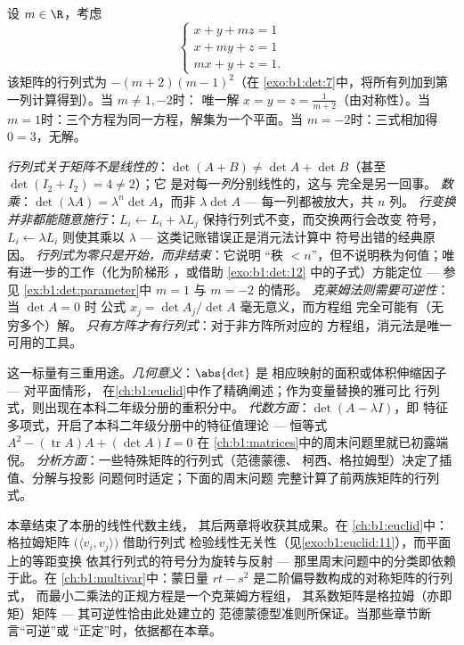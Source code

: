 \begin{example}[含参数的讨论]\label{ex:b1:det:parameter}
设 $m \in \R$，考虑
\[
\begin{cases}
x + y + mz = 1\\
x + my + z = 1\\
mx + y + z = 1 .
\end{cases}
\]
该矩阵的行列式为 $-(m+2)(m-1)^2$（在
\cref{exo:b1:det:7}中，将所有列加到第一列计算得到）。当 $m
\neq 1, -2$时：
唯一解 $x = y = z = \frac{1}{m+2}$（由对称性）。当 $m =
1$时：三个方程为同一方程，解集为一个平面。当 $m =
-2$时：三式相加得 $0 = 3$，无解。
\end{example}

\begin{remark}[常见误区]
\label{rem:b1:det:pitfalls}
\emph{行列式关于矩阵不是线性的}：$\det(A + B)
\neq \det A + \det B$（甚至 $\det(I_2 + I_2) = 4 \neq 2$）；它
是对每一\emph{列}分别线性的，这与
完全是另一回事。
\emph{数乘}：$\det(\lambda A) = \lambda^n\det A$，而非
$\lambda\det A$ --- 每一列都被放大，共 $n$ 列。
\emph{行变换并非都能随意施行}：$L_i \leftarrow L_i +
\lambda L_j$ 保持行列式不变，而交换两行会改变
符号，$L_i \leftarrow \lambda L_i$ 则使其乘以 $\lambda$
--- 这类记账错误正是消元法计算中
符号出错的经典原因。
\emph{行列式为零只是开始，而非结束}：它说明
“秩 $< n$”，但不说明秩为何值；唯有进一步的工作（化为阶梯形
，或借助 \cref{exo:b1:det:12} 中的子式）方能定位 --- 参见
\cref{ex:b1:det:parameter}中 $m = 1$ 与 $m = -2$ 的情形。
\emph{克莱姆法则需要可逆性}：当 $\det A = 0$ 时
公式 $x_j = \det A_j/\det A$ 毫无意义，而方程组
完全可能有（无穷多个）解。
\emph{只有方阵才有行列式}：对于非方阵所对应的
方程组，消元法是唯一可用的工具。
\end{remark}

\begin{remark}[行列式的用途]
\label{rem:b1:det:whereused}
这一标量有三重用途。\emph{几何意义}：$\abs{\det}$ 是
相应映射的面积或体积伸缩因子 --- 对平面情形，
在\cref{ch:b1:euclid}中作了精确阐述；作为变量替换的雅可比
行列式，则出现在本科二年级分册的重积分中。
\emph{代数方面}：$\det(A - \lambda I)$，即
特征多项式，开启了本科二年级分册中的特征值理论 ---
恒等式 $A^2 - (\operatorname{tr} A)A + (\det A)I = 0$ 在
\cref{ch:b1:matrices}中的周末问题里就已初露端倪。
\emph{分析方面}：一些特殊矩阵的行列式（范德蒙德、
柯西、格拉姆型）决定了插值、分解与投影
问题何时适定；下面的周末问题
完整计算了前两族矩阵的行列式。
\end{remark}

\begin{remark}[第 3 册内的展望]
\label{rem:b1:det:perspectives}
本章结束了本册的线性代数主线，
其后两章将收获其成果。在
\cref{ch:b1:euclid}中：格拉姆矩阵
$\bigl(\langle v_i, v_j\rangle\bigr)$ 借助行列式
检验线性无关性（见\cref{exo:b1:euclid:11}），而平面上的等距变换
依其行列式的符号分为旋转与反射 ---
那里周末问题中的分类即依赖于此。在
\cref{ch:b1:multivar}中：蒙日量 $rt -
s^2$ 是二阶偏导数构成的对称矩阵的行列式，
而最小二乘法的正规方程是一个克莱姆方程组，
其系数矩阵是格拉姆（亦即矩）矩阵 ---
其可逆性恰由此处建立的
范德蒙德型准则所保证。当那些章节断言“可逆”或
“正定”时，依据都在本章。
\end{remark}

